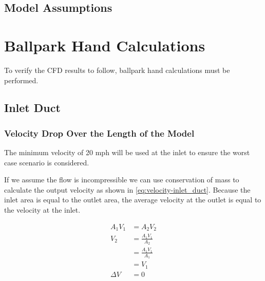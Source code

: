 \documentclass{article}
\begin{document}

\subsection{Model Assumptions}



\section{Ballpark Hand Calculations}
To verify the CFD results to follow, ballpark hand calculations must be performed.


\subsection{Inlet Duct}


\subsubsection{Velocity Drop Over the Length of the Model}
The minimum velocity of 20 mph will be used at the inlet to ensure the worst case scenario is considered.

If we assume the flow is incompressible we can use conservation of mass to calculate the output velocity as shown in \autoref{eq:velocity-inlet_duct}. Because the inlet area is equal to the outlet area, the average velocity at the outlet is equal to the velocity at the inlet.

\begin{equation}
	\begin{aligned}
		A_1 V_1  & = A_2 V_2             \\
		V_2      & = \frac{A_1 V_1}{A_2} \\
		         & = \frac{A_1 V_1}{A_1} \\
		         & = V_1                 \\
		\Delta V & = 0
	\end{aligned}
	\label{eq:velocity-inlet_duct}
\end{equation}
\end{document}

